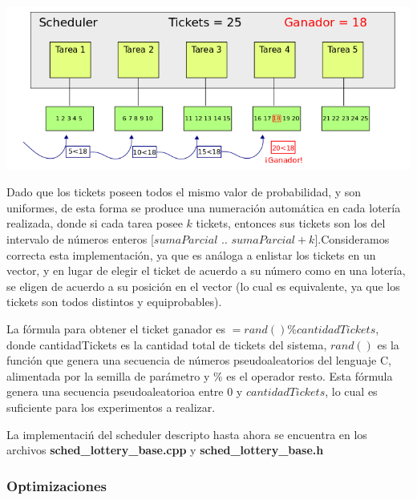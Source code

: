 \begin{center}
    \includegraphics[scale=0.6]{./Graficos/loteria.png}
\end{center}

Dado que los tickets poseen todos el mismo valor de probabilidad, y son uniformes, de esta forma se produce una numeraci\'on autom\'atica en cada loter\'ia realizada, donde si cada tarea posee $k$ tickets, entonces sus tickets son los del intervalo de n\'umeros enteros [$sumaParcial$ .. $sumaParcial + k$].Consideramos correcta esta implementaci\'on, ya que es an\'aloga a enlistar los tickets en un vector, y en lugar de elegir el ticket de acuerdo a su n\'umero como en una loter\'ia, se eligen de acuerdo a su posici\'on en el vector (lo cual es equivalente, ya que los tickets son todos distintos y equiprobables).

\vspace{2mm}

La f\'ormula para obtener el ticket ganador es $ = rand() \% cantidadTickets$, donde cantidadTickets es la cantidad total de tickets del sistema, $rand()$ es la funci\'on que genera una secuencia de n\'umeros pseudoaleatorios del lenguaje C, alimentada por la semilla de par\'ametro y \% es el operador resto. Esta f\'ormula genera una secuencia pseudoaleatorioa entre $0$ y $cantidadTickets$, lo cual es suficiente para los experimentos a realizar.

\vspace{2mm}

La implementaci\'n del scheduler descripto hasta ahora se encuentra en los archivos \textbf{sched\_lottery\_base.cpp} y \textbf{sched\_lottery\_base.h}

\subsubsection{Optimizaciones}

